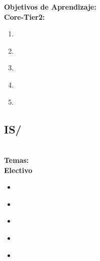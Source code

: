 \noindent \textbf{Objetivos de Aprendizaje:}\\
\noindent \textbf{Core-Tier2:}
\begin{enumerate}
	\setcounter{enumi}{0}
	\item \ISBasicMachineLearningLOListThe\xspace[\ISBasicMachineLearningLOListTheLevel]\label{sec:BOK:ISBasicMachineLearningLOListThe}
	\item \ISBasicMachineLearningLOIdentifyExamples\xspace[\ISBasicMachineLearningLOIdentifyExamplesLevel]\label{sec:BOK:ISBasicMachineLearningLOIdentifyExamples}
	\item \ISBasicMachineLearningLOExplainTheInductive\xspace[\ISBasicMachineLearningLOExplainTheInductiveLevel]\label{sec:BOK:ISBasicMachineLearningLOExplainTheInductive}
	\item \ISBasicMachineLearningLODescribeOver\xspace[\ISBasicMachineLearningLODescribeOverLevel]\label{sec:BOK:ISBasicMachineLearningLODescribeOver}
	\item \ISBasicMachineLearningLOApplyTheLearning\xspace[\ISBasicMachineLearningLOApplyTheLearningLevel]\label{sec:BOK:ISBasicMachineLearningLOApplyTheLearning}
\end{enumerate}


\subsection{IS/\ISAdvancedSearch}\label{sec:BOK:ISAdvancedSearch}
\ISAdvancedSearchDescription\\
\noindent \textbf{Temas:}\\
\noindent \textbf{Electivo}
\begin{itemize}
	\item \ISAdvancedSearchTopicConstructing\label{sec:BOK:ISAdvancedSearchTopicConstructing}
	\item \ISAdvancedSearchTopicStochastic\label{sec:BOK:ISAdvancedSearchTopicStochastic}
	\item \ISAdvancedSearchTopicImplementation\label{sec:BOK:ISAdvancedSearchTopicImplementation}
	\item \ISAdvancedSearchTopicMinimax\label{sec:BOK:ISAdvancedSearchTopicMinimax}
	\item \ISAdvancedSearchTopicExpectimax\label{sec:BOK:ISAdvancedSearchTopicExpectimax}
\end{itemize}



